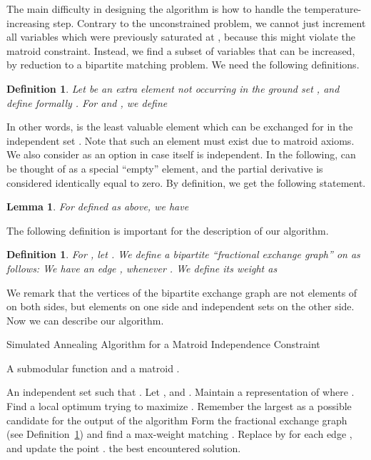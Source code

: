 \documentclass{article}[11pt]
\newcommand{\INPUT}{\item[{\bf Input:}]}
\newcommand{\OUTPUT}{\item[{\bf Output:}]}
\newtheorem{lemma}[theorem]{Lemma}
\newtheorem{definition}[theorem]{Definition}
\begin{document}
The main difficulty in designing the algorithm is how to handle the temperature-increasing
step. Contrary to the unconstrained problem, we cannot just increment all variables
which were previously saturated at , because this might violate the matroid constraint.
Instead, we find a subset of variables that can be increased, by reduction to a bipartite matching
problem. We need the following definitions.

\begin{definition}
\label{def:best-match}
Let  be an extra element not occurring in the ground set , and define formally
. 
For  and ,
we define 

\end{definition}

In other words,  is the least valuable element which can be exchanged for 
in the independent set . Note that such an element must exist due to matroid axioms.
We also consider  as an option in case  itself is independent.
In the following,  can be thought of as a special ``empty'' element,
and the partial derivative  is considered identically equal to zero.
By definition, we get the following statement.

\begin{lemma}
\label{lem:best-match}
For  defined as above, we have

\end{lemma}

The following definition is important for the description of our algorithm.

\begin{definition}
\label{def:ex-graph}
For , let .
We define a bipartite ``fractional exchange graph''  on  as follows:
We have an edge , whenever .
We define its weight as 

\end{definition}

We remark that the vertices of the bipartite exchange graph are not elements of  on both sides, but elements on 
one side and independent sets on the other side.
Now we can describe our algorithm.


\begin{algorithm}[htb]
\caption{Simulated Annealing Algorithm for a Matroid Independence Constraint}
\label{alg:simulated_matroidindependence}
\begin{algorithmic}[1]
\INPUT A submodular function  and a matroid .
\OUTPUT An independent set  such that .
\STATE Let ,   and .
\STATE Maintain a representation of  where . \FOR {}
\STATE   {}
\ENDWHILE
{}
\STATE Find a local optimum  trying to maximize .
\STATE Remember the largest  as  a possible candidate for the output of the algorithm\ENDFOR
\STATE Form the fractional exchange graph (see Definition~\ref{def:ex-graph}) 
and find a max-weight matching . 
\STATE Replace  by  for each edge , and
update the  point .
\ENDFOR
\RETURN  the best encountered solution.
\end{algorithmic}
\end{algorithm}
\end{document}
